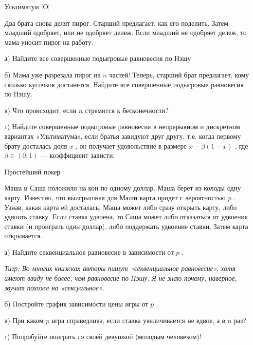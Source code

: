 \begin{problem}
 Ультиматум [О]\par
Два брата снова делят пирог. Старший предлагает, как его поделить. Затем младший одобряет, или не одобряет дележ. Если младший не одобряет дележ, то мама уносит пирог на работу.\par
а) Найдите все совершенные подыгровые равновесия по Нэшу\par
б) Мама уже разрезала пирог на  $n$  частей! Теперь, старший брат предлагает, кому сколько кусочков достанется. Найдите все совершенные подыгровые равновесия по Нэшу.\par
в) Что происходит, если  $n$  стремится к бесконечности?\par
г) Найдите совершенные подыгровые равновесия в непрерывном и дискретном вариантах «Ультиматума», если братья завидуют друг другу, т.е. когда первому брату досталась доля  $x$ , он получает удовольствие в размере  $x-\beta \left(1-x\right)$ , где  $\beta \in \left(0;1\right)$  — коэффициент зависти.



\begin{sol}

\end{sol}
\end{problem}




\begin{problem}
 Простейший покер \par
Маша и Саша положили на кон по одному доллар. Маша берет из колоды одну карту. Известно, что выигрышная для Маши карта придет с вероятностью  $p$ . Узнав, какая карта ей досталась, Маша может либо сразу открыть карту, либо удвоить ставку. Если ставка удвоена, то Саша может либо отказаться от удвоения ставки (и проиграть один доллар), либо поддержать удвоение ставки. Затем карта открывается.\par
а) Найдите секвенциальное равновесие в зависимости от  $p$ . \par
{\it Тигр: Во многих книжках авторы пишут «секвенциальное равновесие», хотя имеют ввиду не более, чем равновесие по Нэшу. Я не знаю почему, наверное, звучит похоже на «сексуальное».}\par
б) Постройте график зависимости цены игры от  $p$ .\par
в) При каком  $p$  игра справедлива, если ставка увеличивается не вдвое, а в  $n$  раз?\par
г) Попробуйте поиграть со своей девушкой (молодым человеком)!\par



\begin{sol}

\end{sol}
\end{problem}



